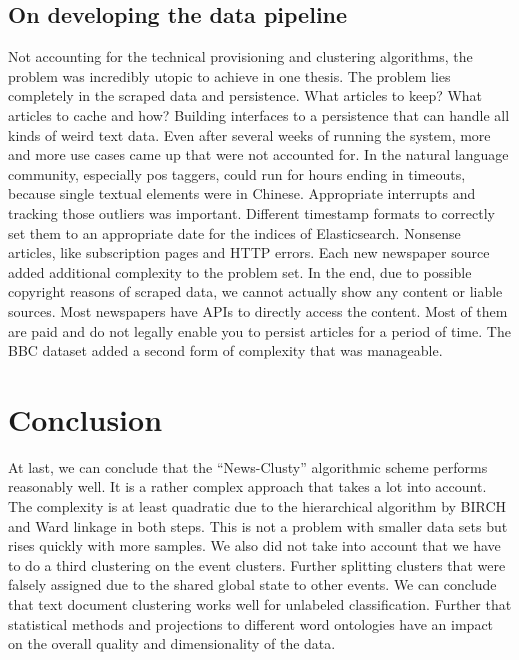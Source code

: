 \subsection*{On developing the data pipeline} 
Not accounting for the technical provisioning and clustering algorithms, the problem was incredibly utopic to achieve in one thesis. The problem lies completely in the scraped data and persistence. What articles to keep? What articles to cache and how? Building interfaces to a persistence that can handle all kinds of weird text data. Even after several weeks of running the system, more and more use cases came up that were not accounted for. In the natural language community, especially pos taggers, could run for hours ending in timeouts, because single textual elements were in Chinese. Appropriate interrupts and tracking those outliers was important. Different timestamp formats to correctly set them to an appropriate date for the indices of Elasticsearch. Nonsense articles, like subscription pages and HTTP errors. Each new newspaper source added additional complexity to the problem set. In the end, due to possible copyright reasons of scraped data, we cannot actually show any content or liable sources. Most newspapers have APIs to directly access the content. Most of them are paid and do not legally enable you to persist articles for a period of time. The BBC dataset added a second form of complexity that was manageable.


\section{Conclusion}
At last, we can conclude that the ``News-Clusty'' algorithmic scheme performs reasonably well. It is a rather complex approach that takes a lot into account. The complexity is at least quadratic due to the hierarchical algorithm by BIRCH and Ward linkage in both steps. This is not a problem with smaller data sets but rises quickly with more samples. We also did not take into account that we have to do a third clustering on the event clusters. Further splitting clusters that were falsely assigned due to the shared global state to other events. We can conclude that text document clustering works well for unlabeled classification. Further that statistical methods and projections to different word ontologies have an impact on the overall quality and dimensionality of the data. 

